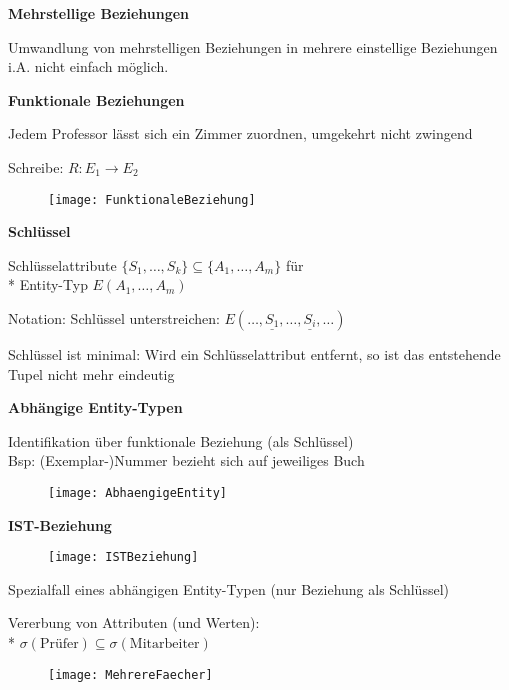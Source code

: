 \textbf{Mehrstellige Beziehungen}
\begin{items}
	\item Umwandlung von mehrstelligen Beziehungen in mehrere einstellige Beziehungen i.A. nicht einfach möglich.
\end{items}

\textbf{Funktionale Beziehungen}
\begin{items}
	\item Jedem Professor lässt sich ein Zimmer zuordnen, umgekehrt nicht zwingend
	\item Schreibe: \( R: E_1 \to E_2 \)
\end{items}
\begin{figure}[H]\centering\label{FunktionaleBeziehung}\texttt{[image: FunktionaleBeziehung]}\end{figure}

\newpage

\textbf{Schlüssel}
\begin{items}
	\item Schlüsselattribute \( \{ S_1, \dots, S_k \} \subseteq \{ A_1, \dots, A_m \} \) für \\* Entity-Typ \( E(A_1, \dots, A_m) \)
	\item Notation: Schlüssel unterstreichen: \( E(\dots, \underline{S_1}, \dots, \underline{S_i}, \dots) \)
	\item Schlüssel ist minimal: Wird ein Schlüsselattribut entfernt, so ist das entstehende Tupel nicht mehr eindeutig
\end{items}

\textbf{Abhängige Entity-Typen}
\begin{items}
	\item Identifikation über funktionale Beziehung (als Schlüssel)\\
	Bsp: (Exemplar-)Nummer bezieht sich auf jeweiliges Buch
\end{items}
\begin{figure}[H]\centering\label{AbhaengigeEntity}\texttt{[image: AbhaengigeEntity]}\end{figure}

\textbf{IST-Beziehung}
\begin{figure}[H]\centering\label{ISTBeziehung}\texttt{[image: ISTBeziehung]}\end{figure}
\begin{items}
	\item Spezialfall eines abhängigen Entity-Typen (nur Beziehung als Schlüssel)
	\item Vererbung von Attributen (und Werten): \\* \( \sigma(\text{Prüfer}) \subseteq \sigma(\text{Mitarbeiter}) \)
\end{items}
\begin{figure}[H]\centering\label{MehrereFaecher}\texttt{[image: MehrereFaecher]}\end{figure}

